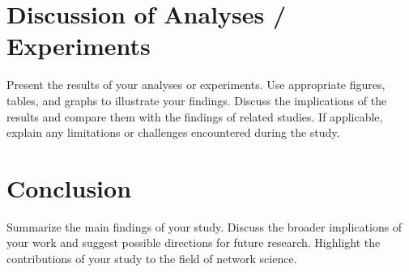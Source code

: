 \documentclass[a4paper,11pt]{article}
\begin{document}
\section{Discussion of Analyses / Experiments}
Present the results of your analyses or experiments. Use appropriate figures, tables, and graphs to illustrate your findings. Discuss the implications of the results and compare them with the findings of related studies. If applicable, explain any limitations or challenges encountered during the study.

\section{Conclusion}
Summarize the main findings of your study. Discuss the broader implications of your work and suggest possible directions for future research. Highlight the contributions of your study to the field of network science.

%
%
\end{document}
